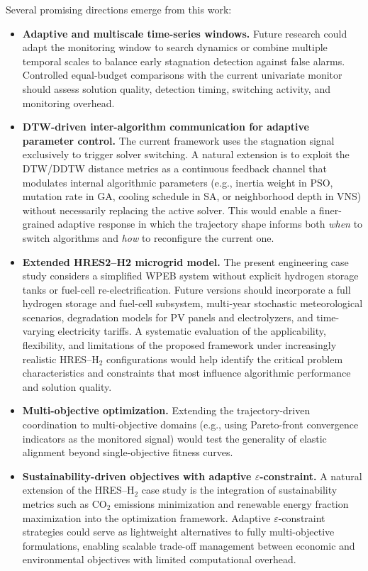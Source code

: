\documentclass[review]{elsarticle}
\begin{document}
Several promising directions emerge from this work:
\begin{itemize}
    \item \textbf{Adaptive and multiscale time-series windows.} Future research could adapt the monitoring window to search dynamics or combine multiple temporal scales to balance early stagnation detection against false alarms. Controlled equal-budget comparisons with the current univariate monitor should assess solution quality, detection timing, switching activity, and monitoring overhead.
    \item \textbf{DTW-driven inter-algorithm communication for adaptive parameter control.} The current framework uses the stagnation signal exclusively to trigger solver switching. A natural extension is to exploit the DTW/DDTW distance metrics as a continuous feedback channel that modulates internal algorithmic parameters (e.g., inertia weight in PSO, mutation rate in GA, cooling schedule in SA, or neighborhood depth in VNS) without necessarily replacing the active solver. This would enable a finer-grained adaptive response in which the trajectory shape informs both \emph{when} to switch algorithms and \emph{how} to reconfigure the current one.
    \item \textbf{Extended HRES2--H2 microgrid model.} The present engineering case study considers a simplified WPEB system without explicit hydrogen storage tanks or fuel-cell re-electrification. Future versions should incorporate a full hydrogen storage and fuel-cell subsystem, multi-year stochastic meteorological scenarios, degradation models for PV panels and electrolyzers, and time-varying electricity tariffs. A systematic evaluation of the applicability, flexibility, and limitations of the proposed framework under increasingly realistic HRES--H$_2$ configurations would help identify the critical problem characteristics and constraints that most influence algorithmic performance and solution quality.
    \item \textbf{Multi-objective optimization.} Extending the trajectory-driven coordination to multi-objective domains (e.g., using Pareto-front convergence indicators as the monitored signal) would test the generality of elastic alignment beyond single-objective fitness curves.
    \item \textbf{Sustainability-driven objectives with adaptive $\varepsilon$-constraint.} A natural extension of the HRES--H$_2$ case study is the integration of sustainability metrics such as CO$_2$ emissions minimization and renewable energy fraction maximization into the optimization framework. Adaptive $\varepsilon$-constraint strategies could serve as lightweight alternatives to fully multi-objective formulations, enabling scalable trade-off management between economic and environmental objectives with limited computational overhead.
\end{itemize}
\end{document}
